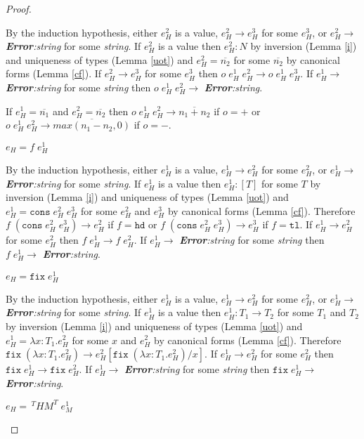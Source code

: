 \begin{theorem}
\begin{proof}
\begin{case}
By the induction hypothesis, either $e_{H}^{2}$ is a value, $e_{H}^{2}\rightarrow e_{H}^{3}$ for some $e_{H}^{3}$, or $e_{H}^{2}\rightarrow$ \emph{\textbf{Error}:\;string} for some \emph{string}.  If $e_{H}^{2}$ is a value then $e_{H}^{2}:N$ by inversion (Lemma \ref{i}) and uniqueness of types (Lemma \ref{uot}) and $e_{H}^{2}=\overline{n_{2}}$ for some $\overline{n_{2}}$ by canonical forms (Lemma \ref{cf}).  If $e_{H}^{2}\rightarrow e_{H}^{3}$ for some $e_{H}^{3}$ then $o\;e_{H}^{1}\;e_{H}^{2}\rightarrow o\;e_{H}^{1}\;e_{H}^{3}$.  If $e_{H}^{1}\rightarrow$ \emph{\textbf{Error}:\;string} for some \emph{string} then $o\;e_{H}^{1}\;e_{H}^{2}\rightarrow$ \emph{\textbf{Error}:\;string}.

If $e_{H}^{1}=\overline{n_{1}}$ and $e_{H}^{2}=\overline{n_{2}}$ then $o\;e_{H}^{1}\;e_{H}^{2}\rightarrow \overline{n_{1}+n_{2}}$ if $o=+$ or $o\;e_{H}^{1}\;e_{H}^{2}\rightarrow \overline{max(n_{1}-n_{2},0)}$ if $o=-$.
\end{case}
\begin{case}
$e_{H}=f\;e_{H}^{1}$

By the induction hypothesis, either $e_{H}^{1}$ is a value, $e_{H}^{1}\rightarrow e_{H}^{2}$ for some $e_{H}^{2}$, or $e_{H}^{1}\rightarrow$ \emph{\textbf{Error}:\;string} for some \emph{string}.  If $e_{H}^{1}$ is a value then $e_{H}^{1}:[T]$ for some $T$ by inversion (Lemma \ref{i}) and uniqueness of types (Lemma \ref{uot}) and $e_{H}^{1}=\mathtt{cons}\;e_{H}^{2}\;e_{H}^{3}$ for some $e_{H}^{2}$ and $e_{H}^{3}$ by canonical forms (Lemma \ref{cf}).  Therefore $f\;(\mathtt{cons}\;e_{H}^{2}\;e_{H}^{3})\rightarrow e_{H}^{2}$ if $f=\mathtt{hd}$ or $f\;(\mathtt{cons}\;e_{H}^{2}\;e_{H}^{3})\rightarrow e_{H}^{3}$ if $f=\mathtt{tl}$.  If $e_{H}^{1}\rightarrow e_{H}^{2}$ for some $e_{H}^{2}$ then $f\;e_{H}^{1}\rightarrow f\;e_{H}^{2}$.  If $e_{H}^{1}\rightarrow$ \emph{\textbf{Error}:\;string} for some \emph{string} then $f\;e_{H}^{1}\rightarrow$ \emph{\textbf{Error}:\;string}.
\end{case}
\begin{case}
$e_{H}=\mathtt{fix}\;e_{H}^{1}$

By the induction hypothesis, either $e_{H}^{1}$ is a value, $e_{H}^{1}\rightarrow e_{H}^{2}$ for some $e_{H}^{2}$, or $e_{H}^{1}\rightarrow$ \emph{\textbf{Error}:\;string} for some \emph{string}.  If $e_{H}^{1}$ is a value then $e_{H}^{1}:T_{1}\rightarrow T_{2}$ for some $T_{1}$ and $T_{2}$ by inversion (Lemma \ref{i}) and uniqueness of types (Lemma \ref{uot}) and $e_{H}^{1}=\lambda x:T_{1}.e_{H}^{2}$ for some $x$ and $e_{H}^{2}$ by canonical forms (Lemma \ref{cf}).  Therefore $\mathtt{fix}\;(\lambda x:T_{1}.e_{H}^{2})\rightarrow e_{H}^{2}[\mathtt{fix}\;(\lambda x:T_{1}.e_{H}^{2})/x]$.  If $e_{H}^{1}\rightarrow e_{H}^{2}$ for some $e_{H}^{2}$ then $\mathtt{fix}\;e_{H}^{1}\rightarrow\mathtt{fix}\;e_{H}^{2}$.  If $e_{H}^{1}\rightarrow$ \emph{\textbf{Error}:\;string} for some \emph{string} then $\mathtt{fix}\;e_{H}^{1}\rightarrow$ \emph{\textbf{Error}:\;string}.
\end{case}
\begin{case}
$e_{H}=\,^{T}HM^{T}\;e_{M}^{1}$


\end{case}
\end{proof}
\end{theorem}

